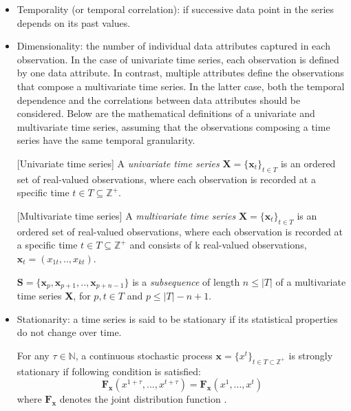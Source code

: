 \begin{itemize}
    \item Temporality (or temporal correlation): if successive data point in the series depends on its past values.
    \item Dimensionality: the number of individual data attributes captured in each observation. In the case of univariate time series, each observation is defined by one data attribute. In contrast, multiple attributes define the observations that compose a multivariate time series. In the latter case, both the temporal dependence and the correlations between data attributes should be considered. Below are the mathematical definitions of a univariate and multivariate time series, assuming that the observations composing a time series have the same temporal granularity.
    \begin{definition} \label{def:univariate-timeseries}
    [Univariate time series] A \textit{univariate time series} $\textbf{X}=\{\textbf{x}_t\}_{t\in T}$ is an ordered set of real-valued observations, where each observation is recorded at a specific time $t \in T \subseteq \mathbb{Z}^+$. 
    \end{definition}
    \begin{definition} \label{def:multivariate-timeseries}
    [Multivariate time series] A \textit{multivariate time series} $\textbf{X}=\{\textbf{x}_t\}_{t\in T}$ is an ordered set of real-valued observations, where each observation is recorded at a specific time $t \in T \subseteq \mathbb{Z}^+$ and consists of k real-valued observations, $\textbf{x}_t = (x_{1t}, .., x_{kt})$. 
    \end{definition}    
    \begin{definition}
    [Subsequence] $\textbf{S}=\{\textbf{x}_p,\textbf{x}_{p+1},..,\textbf{x}_{p+n-1}\}$ is a \textit{subsequence} of length $n \leq |T|$ of a multivariate time series \textbf{X}, for $p,t \in T$ and $p \leq |T| - n + 1$.
    \end{definition}    
    \item Stationarity: a time series is said to be stationary if its statistical properties do not change over time. 
    \begin{definition}
     For any $\tau \in \mathbb{N}$, a continuous stochastic process $\textbf{x}=\{x^t\}_{t \in T \subset \mathbb{Z}^+}$ is strongly stationary if following condition is satisfied:
    $$\bm{F_x}(x^{1+\tau},...,x^{t+\tau})=\bm{F_x}(x^1,...,x^t)$$ 
    where $\bm{F_x}$ denotes the joint distribution function \cite{choi2021deep}.

\end{definition}
\end{itemize}
